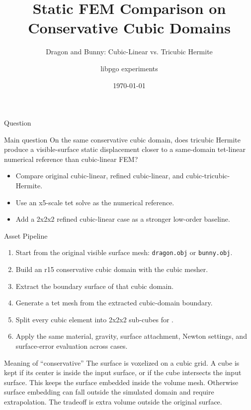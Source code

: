 \documentclass[aspectratio=169,10pt]{beamer}
\title[Dragon and Bunny Static FEM]{Static FEM Comparison on Conservative Cubic Domains}
\subtitle{Dragon and Bunny: Cubic-Linear vs. Tricubic Hermite}
\author{libpgo experiments}
\date{\today}
\newcommand{\case}[1]{\texttt{\detokenize{#1}}}
\begin{document}
\begin{frame}
  \titlepage
\end{frame}

\begin{frame}{Question}
  \begin{block}{Main question}
    On the same conservative cubic domain, does tricubic Hermite produce a visible-surface static displacement closer to a same-domain tet-linear numerical reference than cubic-linear FEM?
  \end{block}

  \vspace{0.4em}
  \begin{itemize}
    \item Compare original cubic-linear, refined cubic-linear, and cubic-tricubic-Hermite.
    \item Use an x5-scale tet solve as the numerical reference.
    \item Add a 2x2x2 refined cubic-linear case as a stronger low-order baseline.
  \end{itemize}
\end{frame}

\begin{frame}{Asset Pipeline}
  \small
  \begin{enumerate}
    \item Start from the original visible surface mesh: \texttt{dragon.obj} or \texttt{bunny.obj}.
    \item Build an r15 conservative cubic domain with the cubic mesher.
    \item Extract the boundary surface of that cubic domain.
    \item Generate a tet mesh from the extracted cubic-domain boundary.
    \item Split every cubic element into 2x2x2 sub-cubes for \case{cubic_linear_x8}.
    \item Apply the same material, gravity, surface attachment, Newton settings, and surface-error evaluation across cases.
  \end{enumerate}

  \vspace{0.7em}
  \begin{block}{Meaning of ``conservative''}
    The surface is voxelized on a cubic grid. A cube is kept if its center is
    inside the input surface, or if the cube intersects the input surface.
    This keeps the surface embedded inside the volume mesh. Otherwise surface
    embedding can fall outside the simulated domain and require extrapolation.
    The tradeoff is extra volume outside the original surface.
  \end{block}
\end{frame}
\end{document}

